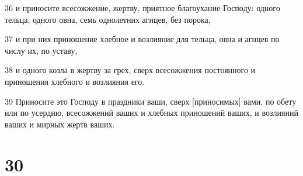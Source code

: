 \par 36 и приносите всесожжение, жертву, приятное благоухание Господу: одного тельца, одного овна, семь однолетних агнцев, без порока,
\par 37 и при них приношение хлебное и возлияние для тельца, овна и агнцев по числу их, по уставу,
\par 38 и одного козла в жертву за грех, сверх всесожжения постоянного и приношения хлебного и возлияния его.
\par 39 Приносите это Господу в праздники ваши, сверх [приносимых] вами, по обету или по усердию, всесожжений ваших и хлебных приношений ваших, и возлияний ваших и мирных жертв ваших.

\chapter{30}

